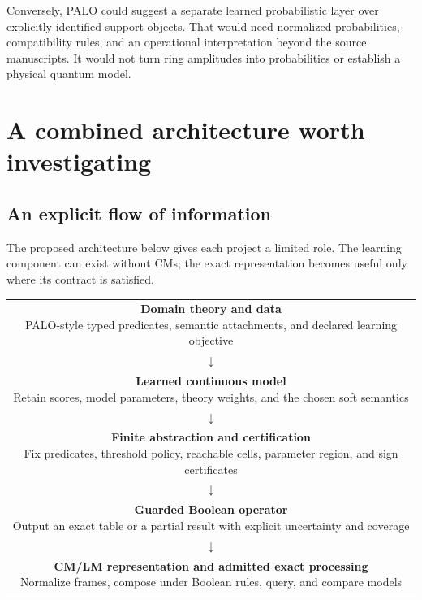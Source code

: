 \documentclass[11pt,a4paper]{article}
\theoremstyle{remark}
\begin{document}
Conversely, PALO could suggest a separate learned probabilistic layer over explicitly identified support objects. That would need normalized probabilities, compatibility rules, and an operational interpretation beyond the source manuscripts. It would not turn ring amplitudes into probabilities or establish a physical quantum model.

\section{A combined architecture worth investigating}
\subsection{An explicit flow of information}
The proposed architecture below gives each project a limited role. The learning component can exist without CMs; the exact representation becomes useful only where its contract is satisfied.

\begin{center}
\begin{tabular}{c}
\fbox{\parbox{0.86\textwidth}{\centering\textbf{Domain theory and data}\\PALO-style typed predicates, semantic attachments, and declared learning objective}}\\[5pt]
$\downarrow$\\[5pt]
\fbox{\parbox{0.86\textwidth}{\centering\textbf{Learned continuous model}\\Retain scores, model parameters, theory weights, and the chosen soft semantics}}\\[5pt]
$\downarrow$\\[5pt]
\fbox{\parbox{0.86\textwidth}{\centering\textbf{Finite abstraction and certification}\\Fix predicates, threshold policy, reachable cells, parameter region, and sign certificates}}\\[5pt]
$\downarrow$\\[5pt]
\fbox{\parbox{0.86\textwidth}{\centering\textbf{Guarded Boolean operator}\\Output an exact table or a partial result with explicit uncertainty and coverage}}\\[5pt]
$\downarrow$\\[5pt]
\fbox{\parbox{0.86\textwidth}{\centering\textbf{CM/LM representation and admitted exact processing}\\Normalize frames, compose under Boolean rules, query, and compare models}}\\
\end{tabular}
\end{center}
\end{document}
